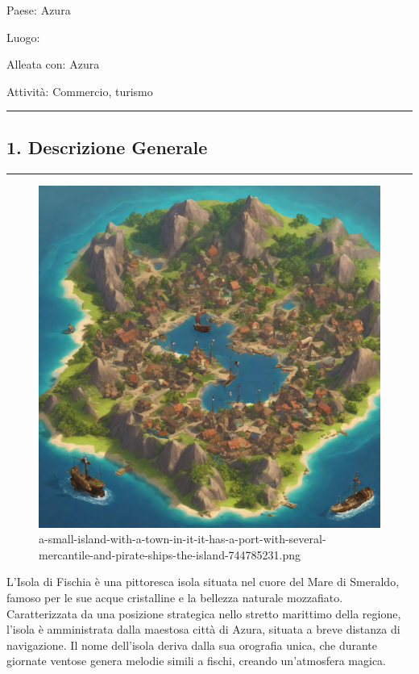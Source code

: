 Paese: Azura

Luogo:

Alleata con: Azura

Attività: Commercio, turismo

\begin{center}\rule{0.5\linewidth}{0.5pt}\end{center}

\subsection{1. Descrizione Generale}\label{descrizione-generale}

\begin{center}\rule{0.5\linewidth}{0.5pt}\end{center}

\begin{figure}
\centering
\includegraphics{a-small-island-with-a-town-in-it-it-has-a-port-with-several-mercantile-and-pirate-ships-the-island-744785231.png}
\caption{a-small-island-with-a-town-in-it-it-has-a-port-with-several-mercantile-and-pirate-ships-the-island-744785231.png}
\end{figure}

L'Isola di Fischia è una pittoresca isola situata nel cuore del Mare di
Smeraldo, famoso per le sue acque cristalline e la bellezza naturale
mozzafiato. Caratterizzata da una posizione strategica nello stretto
marittimo della regione, l'isola è amministrata dalla maestosa città di
Azura, situata a breve distanza di navigazione. Il nome dell'isola
deriva dalla sua orografia unica, che durante giornate ventose genera
melodie simili a fischi, creando un'atmosfera magica.


